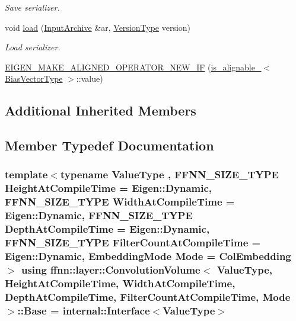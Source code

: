 \begin{DoxyCompactItemize}
\begin{DoxyCompactList}\small\item\em Save serializer. \end{DoxyCompactList}\item 
void \hyperlink{classffnn_1_1layer_1_1_convolution_volume_a77f5965e61f450d0fe72fa091a3e667a}{load} (\hyperlink{classffnn_1_1traits_1_1_serializable_a6e626759259f8f370dd4303b4441a234}{Input\-Archive} \&ar, \hyperlink{classffnn_1_1traits_1_1_serializable_a08924b3b7d20cb3cb6eafe517d4f7b30}{Version\-Type} version)
\begin{DoxyCompactList}\small\item\em Load serializer. \end{DoxyCompactList}\item 
\hyperlink{classffnn_1_1layer_1_1_convolution_volume_a878f19e1509567f2fe5c39c7b5c95f92}{E\-I\-G\-E\-N\-\_\-\-M\-A\-K\-E\-\_\-\-A\-L\-I\-G\-N\-E\-D\-\_\-\-O\-P\-E\-R\-A\-T\-O\-R\-\_\-\-N\-E\-W\-\_\-\-I\-F} (\hyperlink{structffnn_1_1layer_1_1is__alignable__128}{is\-\_\-alignable\-\_}$<$ \hyperlink{classffnn_1_1layer_1_1_convolution_volume_ac2655aee05415e5ffc76cf7b0ba64e61}{Bias\-Vector\-Type} $>$\-::value)
\end{DoxyCompactItemize}
\subsection*{Additional Inherited Members}


\subsection{Member Typedef Documentation}
\hypertarget{classffnn_1_1layer_1_1_convolution_volume_aca83c6f7b34f8865682859f2e096858d}{
\subsubsection[{Base}]{\setlength{\rightskip}{0pt plus 5cm}template$<$typename Value\-Type , F\-F\-N\-N\-\_\-\-S\-I\-Z\-E\-\_\-\-T\-Y\-P\-E Height\-At\-Compile\-Time = Eigen\-::\-Dynamic, F\-F\-N\-N\-\_\-\-S\-I\-Z\-E\-\_\-\-T\-Y\-P\-E Width\-At\-Compile\-Time = Eigen\-::\-Dynamic, F\-F\-N\-N\-\_\-\-S\-I\-Z\-E\-\_\-\-T\-Y\-P\-E Depth\-At\-Compile\-Time = Eigen\-::\-Dynamic, F\-F\-N\-N\-\_\-\-S\-I\-Z\-E\-\_\-\-T\-Y\-P\-E Filter\-Count\-At\-Compile\-Time = Eigen\-::\-Dynamic, Embedding\-Mode Mode = Col\-Embedding$>$ using {\bf ffnn\-::layer\-::\-Convolution\-Volume}$<$ Value\-Type, Height\-At\-Compile\-Time, Width\-At\-Compile\-Time, Depth\-At\-Compile\-Time, Filter\-Count\-At\-Compile\-Time, Mode $>$\-::{\bf Base} =  {\bf internal\-::\-Interface}$<$Value\-Type$>$}}\label{classffnn_1_1layer_1_1_convolution_volume_aca83c6f7b34f8865682859f2e096858d}


